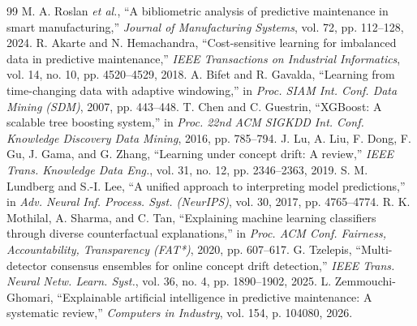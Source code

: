 \documentclass[journal]{IEEEtran}
\begin{document}
\begin{thebibliography}{99}
 M. A. Roslan \textit{et al.}, ``A bibliometric analysis of predictive maintenance in smart manufacturing,'' \textit{Journal of Manufacturing Systems}, vol. 72, pp. 112--128, 2024.
 R. Akarte and N. Hemachandra, ``Cost-sensitive learning for imbalanced data in predictive maintenance,'' \textit{IEEE Transactions on Industrial Informatics}, vol. 14, no. 10, pp. 4520--4529, 2018.
 A. Bifet and R. Gavalda, ``Learning from time-changing data with adaptive windowing,'' in \textit{Proc. SIAM Int. Conf. Data Mining (SDM)}, 2007, pp. 443--448.
 T. Chen and C. Guestrin, ``XGBoost: A scalable tree boosting system,'' in \textit{Proc. 22nd ACM SIGKDD Int. Conf. Knowledge Discovery Data Mining}, 2016, pp. 785--794.
 J. Lu, A. Liu, F. Dong, F. Gu, J. Gama, and G. Zhang, ``Learning under concept drift: A review,'' \textit{IEEE Trans. Knowledge Data Eng.}, vol. 31, no. 12, pp. 2346--2363, 2019.
 S. M. Lundberg and S.-I. Lee, ``A unified approach to interpreting model predictions,'' in \textit{Adv. Neural Inf. Process. Syst. (NeurIPS)}, vol. 30, 2017, pp. 4765--4774.
 R. K. Mothilal, A. Sharma, and C. Tan, ``Explaining machine learning classifiers through diverse counterfactual explanations,'' in \textit{Proc. ACM Conf. Fairness, Accountability, Transparency (FAT*)}, 2020, pp. 607--617.
 G. Tzelepis, ``Multi-detector consensus ensembles for online concept drift detection,'' \textit{IEEE Trans. Neural Netw. Learn. Syst.}, vol. 36, no. 4, pp. 1890--1902, 2025.
 L. Zemmouchi-Ghomari, ``Explainable artificial intelligence in predictive maintenance: A systematic review,'' \textit{Computers in Industry}, vol. 154, p. 104080, 2026.
\end{thebibliography}
\end{document}
